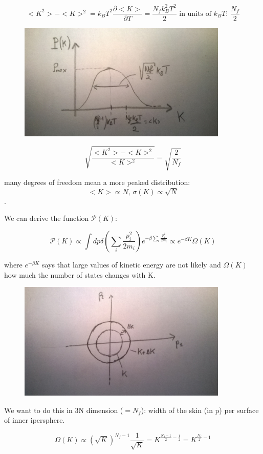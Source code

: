 \documentclass[a4paper, italian, openany]{book}
\begin{document}
$$<K^2> - <K>^2 = k_B T^2 \frac{\partial <K>}{\partial T} = \frac{N_f k_B^2 T^2}{2} \mbox{ in units of $k_B T$: } \frac{N_f}{2}$$

\begin{figure}[H]
\centering
\includegraphics[width=100mm]{img/pic10.jpg}
\end{figure}

$$\sqrt{\frac{<K^2> - <K>^2}{<K>^2}} = \sqrt{\frac{2}{N_f}}$$

many degrees of freedom mean a more peaked distribution: $$<K> \propto N \mbox{, } \sigma(K) \propto \sqrt{N}$$.

We can derive the function $\mathcal{P}(K)$:

$$\mathcal{P}(K) \propto \int dp \delta(\sum_i \frac{p_i^2}{2 m_i}) e^{-\beta \sum_i \frac{p_i^2}{2m_i}} \propto e^{-\beta K} \Omega(K)$$

where $e^{-\beta K}$ says that large values of kinetic energy are not likely and $\Omega(K)$ how much the number of states changes with K.

\begin{figure}[H]
\centering
\includegraphics[width=100mm]{img/pic11.jpg}
\end{figure}

We want to do this in 3N dimension ($= N_f$): width of the skin (in p) per surface of inner ipersphere.

$$\Omega(K) \propto (\sqrt{K})^{N_f -1} \frac{1}{\sqrt{K}} = K^{\frac{N_f -1}{2} - \frac{1}{2}} = K^{\frac{N_f}{2}-1}$$
\end{document}

